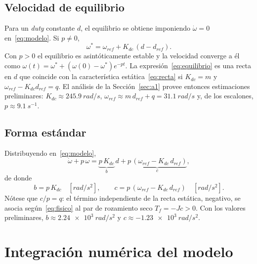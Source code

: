 \documentclass[journal,10pt,a4paper]{IEEEtran}
\begin{document}
\subsection{Velocidad de equilibrio}
Para un \emph{duty} constante $d$, el equilibrio se obtiene imponiendo $\dot\omega=0$ en~\eqref{eq:modelo}. Si $p\neq0$,
\begin{equation}
\omega^*=\omega_{ref}+K_{dc}\,(d-d_{ref}).
\label{eq:equilibrio}
\end{equation}
Con $p>0$ el equilibrio es asintóticamente estable y la velocidad converge a él como $\omega(t)=\omega^*+(\omega(0)-\omega^*)e^{-pt}$. La expresión~\eqref{eq:equilibrio} es una recta en $d$ que coincide con la característica estática~\eqref{eq:recta} si $K_{dc}=m$ y $\omega_{ref}-K_{dc}d_{ref}=q$. El análisis de la Sección~\ref{sec:a1} provee entonces estimaciones preliminares: $K_{dc}\approx\SI{245.9}{rad/s}$, $\omega_{ref}\approx m\,d_{ref}+q=\SI{31.1}{rad/s}$ y, de los escalones, $p\approx\SI{9.1}{s^{-1}}$.

\subsection{Forma estándar}
Distribuyendo en~\eqref{eq:modelo},
\begin{equation}
\dot\omega+p\,\omega=\underbrace{p\,K_{dc}}_{b}\,d+\underbrace{p\,(\omega_{ref}-K_{dc}\,d_{ref})}_{c},
\label{eq:estandar}
\end{equation}
de donde
\begin{equation}
b=p\,K_{dc}\quad[\si{rad/s^2}],\qquad c=p\,(\omega_{ref}-K_{dc}\,d_{ref})\quad[\si{rad/s^2}].
\end{equation}
Nótese que $c/p=q$: el término independiente de la recta estática, negativo, se asocia según~\eqref{eq:fisico} al par de rozamiento seco $T_f=-Jc>0$. Con los valores preliminares, $b\approx\SI{2.24e3}{rad/s^2}$ y $c\approx\SI{-1.23e3}{rad/s^2}$.

\section{Integración numérica del modelo}\label{sec:a3}
\end{document}
